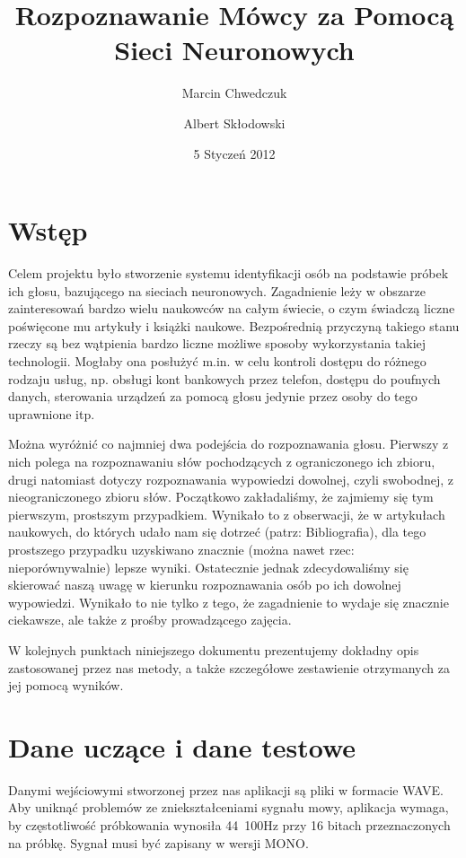 \documentclass[a4paper]{article}
\author{Marcin Chwedczuk \and Albert Skłodowski}
\title{Rozpoznawanie Mówcy za Pomocą Sieci Neuronowych}
\date{5 Styczeń 2012}
\begin{document}
	\maketitle
	\tableofcontents
	
\section{Wstęp}
Celem projektu było stworzenie systemu identyfikacji osób na podstawie próbek ich głosu, bazującego na sieciach neuronowych. Zagadnienie leży w obszarze zainteresowań bardzo wielu naukowców na całym świecie, o czym świadczą liczne poświęcone mu artykuły i książki naukowe. Bezpośrednią przyczyną takiego stanu rzeczy są bez wątpienia bardzo liczne możliwe sposoby wykorzystania takiej technologii. Mogłaby ona posłużyć m.in. w celu kontroli dostępu do różnego rodzaju usług, np. obsługi kont bankowych przez telefon, dostępu do poufnych danych, sterowania urządzeń za pomocą głosu jedynie przez osoby do tego uprawnione itp.

Można wyróżnić co najmniej dwa podejścia do rozpoznawania głosu. Pierwszy z nich polega na rozpoznawaniu słów pochodzących z ograniczonego ich zbioru, drugi natomiast dotyczy rozpoznawania wypowiedzi dowolnej, czyli swobodnej, z nieograniczonego zbioru słów. Początkowo zakładaliśmy, że zajmiemy się tym pierwszym, prostszym przypadkiem. Wynikało to z obserwacji, że w artykułach naukowych, do których udało nam się dotrzeć (patrz: Bibliografia), dla tego prostszego przypadku uzyskiwano znacznie (można nawet rzec: nieporównywalnie) lepsze wyniki. Ostatecznie jednak zdecydowaliśmy się skierować naszą uwagę w kierunku rozpoznawania osób po ich dowolnej wypowiedzi. Wynikało to nie tylko z tego, że zagadnienie to wydaje się znacznie ciekawsze, ale także z prośby prowadzącego zajęcia.

W kolejnych punktach niniejszego dokumentu prezentujemy dokładny opis zastosowanej przez nas metody, a także szczegółowe zestawienie otrzymanych za jej pomocą wyników.

\section{Dane uczące i dane testowe}

Danymi wejściowymi stworzonej przez nas aplikacji są pliki w formacie WAVE. Aby uniknąć problemów ze zniekształceniami sygnału mowy, aplikacja wymaga, by częstotliwość próbkowania wynosiła 44~100Hz przy 16 bitach przeznaczonych na próbkę. Sygnał musi być zapisany w wersji MONO.
\end{document}
